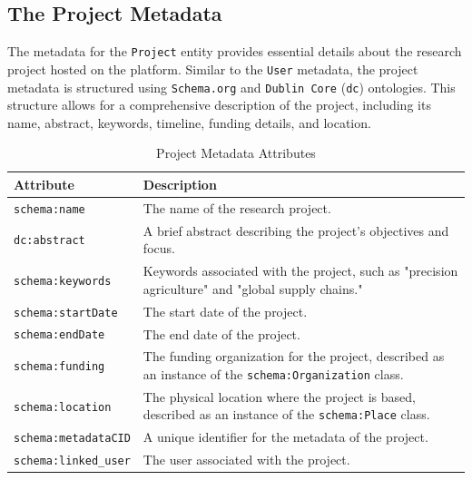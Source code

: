 \documentclass[final]{rc-book-2.14}
\begin{document}
\subsection{The Project Metadata}

The metadata for the \texttt{Project} entity provides essential details about the research project hosted on the platform. Similar to the \texttt{User} metadata, the project metadata is structured using \texttt{Schema.org} and \texttt{Dublin Core} (\texttt{dc}) ontologies. This structure allows for a comprehensive description of the project, including its name, abstract, keywords, timeline, funding details, and location.

\begin{table}[h]
    \centering
    \label{tab:project_metadata}
    \renewcommand{\arraystretch}{1.2}
    \begin{tabularx}{\textwidth}{|l|X|}
        \hline
        \textbf{Attribute}           & \textbf{Description}                                                                                           \\ \hline
        \texttt{schema:name}         & The name of the research project.                                                                              \\ \hline
        \texttt{dc:abstract}         & A brief abstract describing the project's objectives and focus.                                                \\ \hline
        \texttt{schema:keywords}     & Keywords associated with the project, such as "precision agriculture" and "global supply chains."              \\ \hline
        \texttt{schema:startDate}    & The start date of the project.                                                                                 \\ \hline
        \texttt{schema:endDate}      & The end date of the project.                                                                                   \\ \hline
        \texttt{schema:funding}      & The funding organization for the project, described as an instance of the \texttt{schema:Organization} class.  \\ \hline
        \texttt{schema:location}     & The physical location where the project is based, described as an instance of the \texttt{schema:Place} class. \\ \hline
        \texttt{schema:metadataCID}  & A unique identifier for the metadata of the project.                                                           \\ \hline
        \texttt{schema:linked\_user} & The user associated with the project.                                                                          \\ \hline
    \end{tabularx}
    \caption{Project Metadata Attributes}
\end{table}
\end{document}
